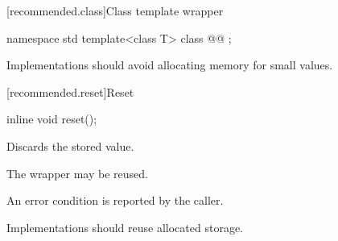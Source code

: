 [recommended.class]{Class template wrapper}

\begin{codeblock}
namespace std {
  template<class T>
  class @@ {};
}
\end{codeblock}

\pnum
\recommended
Implementations should avoid allocating memory for small values.

[recommended.reset]{Reset}

%
\begin{itemdecl}
inline void reset();
\end{itemdecl}

\begin{itemdescr}
\pnum
\effects
Discards the stored value.

\pnum
\remarks
The wrapper may be reused.

\pnum
\errors
An error condition is reported by the caller.

\pnum
\recommended
Implementations should reuse allocated storage.
\end{itemdescr}
